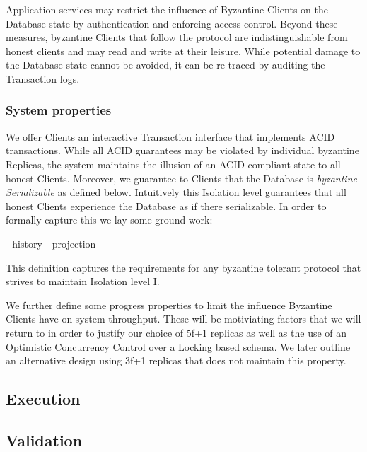 Application services may restrict the influence of Byzantine Clients on the Database state by authentication and enforcing access control. Beyond these measures, byzantine Clients that follow the protocol are indistinguishable from honest clients and may read and write at their leisure. While potential damage to the Database state cannot be avoided, it can be re-traced by auditing the Transaction logs.
 
\subsubsection{System properties}
We offer Clients an interactive Transaction interface that implements ACID transactions. While all ACID guarantees may be violated by individual byzantine Replicas, the system maintains the illusion of an ACID compliant state to all honest Clients.
Moreover, we guarantee to Clients that the Database is \textit{byzantine Serializable} as defined below. Intuitively this Isolation level guarantees that all honest Clients experience the Database as if there serializable. In order to formally capture this we lay some ground work:

- history
- projection
-

This definition captures the requirements for any byzantine tolerant protocol that strives to maintain Isolation level I.

We further define some progress properties to limit the influence Byzantine Clients have on system throughput. These will be motiviating factors that we will return to in order to justify our choice of 5f+1 replicas as well as the use of an Optimistic Concurrency Control over a Locking based schema. We later outline an alternative design using 3f+1 replicas that does not maintain this property. 




\subsection{Execution}
\subsection{Validation}

